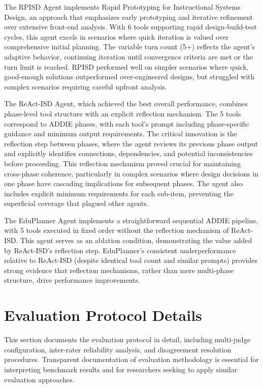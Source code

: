 The RPISD Agent implements Rapid Prototyping for Instructional Systems Design, an approach that emphasizes early prototyping and iterative refinement over extensive front-end analysis. With 6 tools supporting rapid design-build-test cycles, this agent excels in scenarios where quick iteration is valued over comprehensive initial planning. The variable turn count (5+) reflects the agent's adaptive behavior, continuing iteration until convergence criteria are met or the turn limit is reached. RPISD performed well on simpler scenarios where quick, good-enough solutions outperformed over-engineered designs, but struggled with complex scenarios requiring careful upfront analysis.

The ReAct-ISD Agent, which achieved the best overall performance, combines phase-level tool structure with an explicit reflection mechanism. The 5 tools correspond to ADDIE phases, with each tool's prompt including phase-specific guidance and minimum output requirements. The critical innovation is the reflection step between phases, where the agent reviews its previous phase output and explicitly identifies connections, dependencies, and potential inconsistencies before proceeding. This reflection mechanism proved crucial for maintaining cross-phase coherence, particularly in complex scenarios where design decisions in one phase have cascading implications for subsequent phases. The agent also includes explicit minimum requirements for each sub-item, preventing the superficial coverage that plagued other agents.

The EduPlanner Agent implements a straightforward sequential ADDIE pipeline, with 5 tools executed in fixed order without the reflection mechanism of ReAct-ISD. This agent serves as an ablation condition, demonstrating the value added by ReAct-ISD's reflection step. EduPlanner's consistent underperformance relative to ReAct-ISD (despite identical tool count and similar prompts) provides strong evidence that reflection mechanisms, rather than mere multi-phase structure, drive performance improvements.

\section{Evaluation Protocol Details}
\label{app:eval-protocol}

This section documents the evaluation protocol in detail, including multi-judge configuration, inter-rater reliability analysis, and disagreement resolution procedures. Transparent documentation of evaluation methodology is essential for interpreting benchmark results and for researchers seeking to apply similar evaluation approaches.

